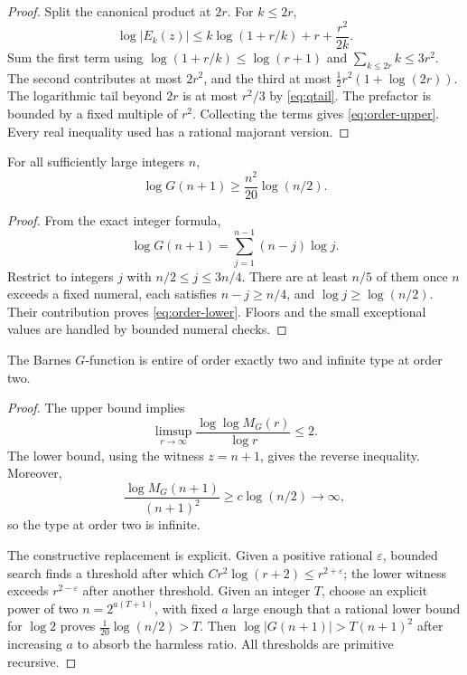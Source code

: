 \begin{proof}
Split the canonical product at \(2r\).  For \(k\le2r\),
\[
 \log|E_k(z)|
 \le k\log(1+r/k)+r+\frac{r^2}{2k}.
\]
Sum the first term using
\(\log(1+r/k)\le\log(r+1)\) and
\(\sum_{k\le2r}k\le3r^2\).  The second contributes at most \(2r^2\), and the
third at most
\(
\frac12r^2(1+\log(2r))
\).
The logarithmic tail beyond \(2r\) is at most \(r^2/3\) by
\cref{eq:qtail}.  The prefactor is bounded by a fixed multiple of \(r^2\).
Collecting the terms gives \cref{eq:order-upper}.  Every real inequality used
has a rational majorant version.
\end{proof}

\begin{lemma}\label{lem:order-lower}
For all sufficiently large integers \(n\),
\begin{equation}\label{eq:order-lower}
 \log G(n+1)\ge \frac{n^2}{20}\log(n/2).
\end{equation}
\end{lemma}

\begin{proof}
From the exact integer formula,
\[
 \log G(n+1)=\sum_{j=1}^{n-1}(n-j)\log j.
\]
Restrict to integers \(j\) with \(n/2\le j\le3n/4\).  There are at least
\(n/5\) of them once \(n\) exceeds a fixed numeral, each satisfies
\(n-j\ge n/4\), and \(\log j\ge\log(n/2)\).  Their contribution proves
\cref{eq:order-lower}.  Floors and the small exceptional values are handled by
bounded numeral checks.
\end{proof}

\begin{theorem}\label{thm:order-type}
The Barnes $G$-function is entire of order exactly two and infinite type at
order two.
\end{theorem}

\begin{proof}
The upper bound implies
\[
 \limsup_{r\to\infty}\frac{\log\log M_G(r)}{\log r}\le2.
\]
The lower bound, using the witness \(z=n+1\), gives the reverse inequality.
Moreover,
\[
 \frac{\log M_G(n+1)}{(n+1)^2}
 \ge c\log(n/2)\longrightarrow\infty,
\]
so the type at order two is infinite.

The constructive replacement is explicit.  Given a positive rational
\(\varepsilon\), bounded search finds a threshold after which
\(C r^2\log(r+2)\le r^{2+\varepsilon}\); the lower witness exceeds
\(r^{2-\varepsilon}\) after another threshold.  Given an integer \(T\), choose
an explicit power of two \(n=2^{a(T+1)}\), with fixed \(a\) large enough that a
rational lower bound for \(\log2\) proves
\(\frac1{20}\log(n/2)>T\).  Then
\(\log|G(n+1)|>T(n+1)^2\) after increasing \(a\) to absorb the harmless ratio.
All thresholds are primitive recursive.
\end{proof}

